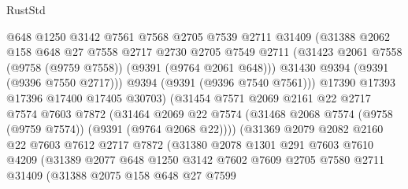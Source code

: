 \begin{lexlean}{RustStd}
\begin{coremodule}
                        @648
                        @1250
                        @3142
                        @7561
                        @7568
                        @2705
                        @7539
                        @2711
                        @31409
                        (@31388
                          @2062
                          @158
                          @648
                          @27
                          @7558
                          @2717
                          @2730
                          @2705
                          @7549
                          @2711
                          (@31423 @2061 @7558 (@9758 (@9759 @7558)) (@9391 (@9764 @2061 @648)))
                          @31430
                          @9394
                          (@9391 (@9396 @7550 @2717)))
                        @9394
                        (@9391 (@9396 @7540 @7561)))
                      @17390
                      @17393
                      @17396
                      @17400
                      @17405
                      @30703)
                    (@31454
                      @7571
                      @2069
                      @2161
                      @22
                      @2717
                      @7574
                      @7603
                      @7872
                      (@31464
                        @2069
                        @22
                        @7574
                        (@31468 @2068 @7574 (@9758 (@9759 @7574)) (@9391 (@9764 @2068 @22))))
                      (@31369
                        @2079
                        @2082
                        @2160
                        @22
                        @7603
                        @7612
                        @2717
                        @7872
                        (@31380
                          @2078
                          @1301
                          @291
                          @7603
                          @7610
                          @4209
                          (@31389
                            @2077
                            @648
                            @1250
                            @3142
                            @7602
                            @7609
                            @2705
                            @7580
                            @2711
                            @31409
                            (@31388
                              @2075
                              @158
                              @648
                              @27
                              @7599

\end{coremodule}
\end{lexlean}
